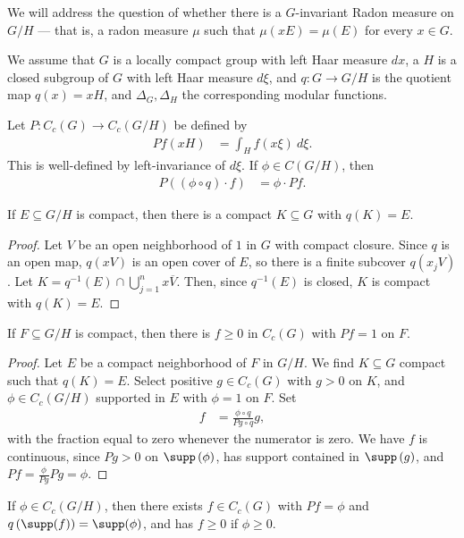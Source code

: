 \documentclass[12pt]{mypackage}
\begin{document}
We will address the question of whether there is a $G$-invariant Radon measure on $G/H$ --- that is, a radon measure $\mu$ such that $\mu\left( xE \right) = \mu\left( E \right)$ for every $x\in G$.

We assume that $G$ is a locally compact group with left Haar measure $dx$, a $H$ is a closed subgroup of $G$ with left Haar measure $d\xi$, and $q\colon G\rightarrow G/H$ is the quotient map $q(x) = xH$, and $\Delta_G,\Delta_H$ the corresponding modular functions.

Let $P\colon C_c(G)\rightarrow C_c(G/H)$ be defined by
\begin{align*}
  Pf(xH) &= \int_{H}^{} f\left( x\xi \right)\:d\xi.
\end{align*}
This is well-defined by left-invariance of $d\xi$. If $\phi\in C\left( G/H \right)$, then
\begin{align*}
  P\left( \left( \phi\circ q \right)\cdot f \right) &= \phi\cdot Pf.
\end{align*}
\begin{lemma}
  If $E\subseteq G/H$ is compact, then there is a compact $K\subseteq G$ with $q(K) = E$.
\end{lemma}
\begin{proof}
  Let $V$ be an open neighborhood of $1$ in $G$ with compact closure. Since $q$ is an open map, $q\left( xV \right)$ is an open cover of $E$, so there is a finite subcover $q\left( x_jV \right)$. Let $K = q^{-1}(E)\cap \bigcup_{j=1}^{n}x \overline{V}$. Then, since $q^{-1}(E)$ is closed, $K$ is compact with $q(K) = E$.
\end{proof}
\begin{lemma}
  If $F\subseteq G/H$ is compact, then there is $f\geq 0$ in $C_c(G)$ with $Pf = 1$ on $F$.
\end{lemma}
\begin{proof}
  Let $E$ be a compact neighborhood of $F$ in $G/H$. We find $K\subseteq G$ compact such that $q(K) = E$. Select positive $g\in C_c(G)$ with $g > 0$ on $K$, and $\phi\in C_c(G/H)$ supported in $E$ with $\phi = 1$ on $F$. Set
  \begin{align*}
    f &= \frac{\phi\circ q}{Pg\circ q}g,
  \end{align*}
  with the fraction equal to zero whenever the numerator is zero. We have $f$ is continuous, since $Pg > 0$ on $\supp\left( \phi \right)$, has support contained in $\supp\left( g \right)$, and $Pf = \frac{\phi}{Pg}Pg = \phi$.
\end{proof}
\begin{proposition}
  If $\phi\in C_c(G/H)$, then there exists $f\in C_c(G)$ with $Pf = \phi$ and $q\left( \supp(f) \right) = \supp(\phi)$, and has $f\geq 0$ if $\phi \geq 0$.
\end{proposition}
\end{document}
